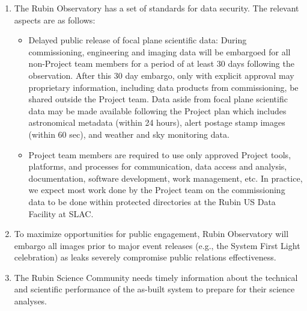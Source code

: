\documentclass[SE,authoryear,toc,lsstdraft]{lsstdoc}
\begin{document}
\begin{enumerate}

  \item The Rubin Observatory has a set of standards for data security.
  The relevant aspects are as follows:

  \begin{itemize}

    \item Delayed public release of focal plane scientific data:
    During commissioning, engineering and imaging data will be embargoed for all non-Project team members for a period of at least 30 days following the observation.
    After this 30 day embargo, only with explicit approval may proprietary information, including data products from commissioning, be shared outside the Project team.
    Data aside from focal plane scientific data may be made available following the Project plan which includes astronomical metadata (within 24 hours), alert postage stamp images (within 60 sec), and weather and sky monitoring data.

    \item Project team members are required to use only approved Project tools, platforms, and processes for communication, data access and analysis, documentation, software development, work management, etc.
    In practice, we expect most work done by the Project team on the commissioning data to be done within protected directories at the Rubin US Data Facility at SLAC.

  \end{itemize}

  \item To maximize opportunities for public engagement, Rubin Observatory will embargo all images prior to major event releases (e.g., the System First Light celebration) as leaks severely compromise public relations effectiveness.

  \item The Rubin Science Community needs timely information about the technical and scientific performance of the as-built system to prepare for their science analyses.


\end{enumerate}
\end{document}

